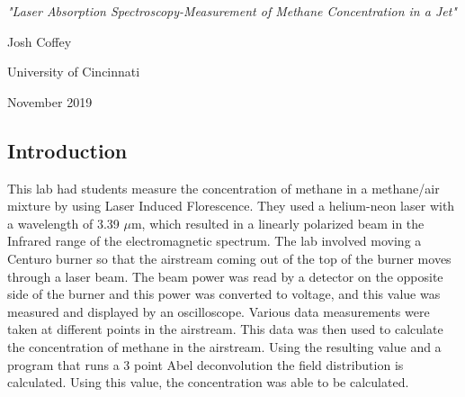 \documentclass{article}
\begin{document}
\begin{titlepage}
    \vspace*{\fill}
    \begin{center}
        \LARGE \textit{"Laser Absorption Spectroscopy-Measurement of Methane Concentration in a Jet"}
    \end{center}
    \begin{center}
       \large Josh Coffey
    \end{center}
    \begin{center}
        \large University of Cincinnati
    \end{center}
    \begin{center}
        \large November 2019
    \end{center}
        \vspace*{\fill}
\end{titlepage}

\begin{center}
    \section*{Introduction}
\end{center}
$$$$
\indent This lab had students measure the concentration of methane in a methane/air mixture by using Laser Induced Florescence.  They used a helium-neon laser with a wavelength of 3.39 $\mu$m, which resulted in a linearly polarized beam in the Infrared range of the electromagnetic spectrum. The lab involved moving a Centuro burner so that the airstream coming out of the top of the burner moves through a laser beam.  The beam power was read by a detector on the opposite side of the burner and this power was converted to voltage, and this value was measured and displayed by an oscilloscope.  Various data measurements were taken at different points in the airstream. \newline
\indent This data was then used to calculate the concentration of methane in the airstream.  Using the resulting value and a program that runs a 3 point Abel deconvolution the field distribution is calculated.  Using this value, the concentration was able to be calculated.

$$$$
\end{document}

